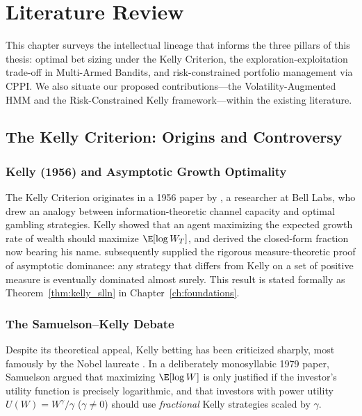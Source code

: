 \chapter{Literature Review}
\label{ch:literature}

This chapter surveys the intellectual lineage that informs the three pillars
of this thesis: optimal bet sizing under the Kelly Criterion, the
exploration-exploitation trade-off in Multi-Armed Bandits, and
risk-constrained portfolio management via CPPI.  We also situate our proposed
contributions---the Volatility-Augmented HMM and the Risk-Constrained Kelly
framework---within the existing literature.

\section{The Kelly Criterion: Origins and Controversy}

\subsection{Kelly (1956) and Asymptotic Growth Optimality}

The Kelly Criterion originates in a 1956 paper by \citet{kelly1956new}, a
researcher at Bell Labs, who drew an analogy between information-theoretic
channel capacity and optimal gambling strategies.  Kelly showed that an agent
maximizing the expected growth rate of wealth should maximize $\E[\log W_T]$,
and derived the closed-form fraction now bearing his name.  \citet{breiman1961}
subsequently supplied the rigorous measure-theoretic proof of asymptotic
dominance: any strategy that differs from Kelly on a set of positive measure
is eventually dominated almost surely.  This result is stated formally as
Theorem~\ref{thm:kelly_slln} in Chapter~\ref{ch:foundations}.

\subsection{The Samuelson--Kelly Debate}

Despite its theoretical appeal, Kelly betting has been criticized sharply,
most famously by the Nobel laureate \citet{samuelson1979}.  In a deliberately
monosyllabic 1979 paper, Samuelson argued that maximizing $\E[\log W]$ is
only justified if the investor's utility function is precisely logarithmic,
and that investors with power utility $U(W) = W^\gamma/\gamma$ ($\gamma \neq 0$)
should use \emph{fractional} Kelly strategies scaled by $\gamma$.

